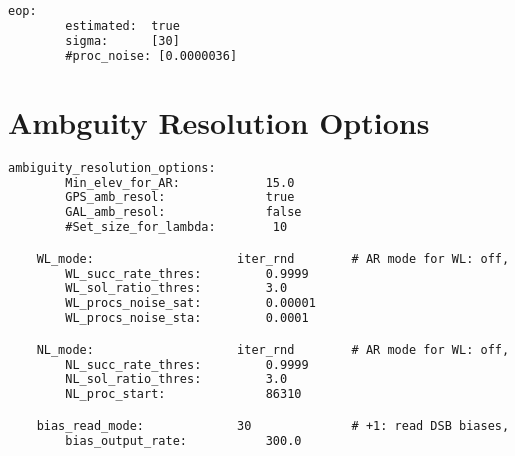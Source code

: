 \begin{lstlisting}[language=xml,caption=yaml input files configuration example]
	eop:
		estimated:  true
		sigma:      [30]
		#proc_noise: [0.0000036]

\end{lstlisting}


\section{Ambguity Resolution Options}
%
\begin{lstlisting}[language=xml,caption=yaml ambguity configuration example]
	ambiguity_resolution_options:
		Min_elev_for_AR:            15.0
		GPS_amb_resol:              true
		GAL_amb_resol:              false
		#Set_size_for_lambda:        10

	WL_mode:                    iter_rnd        # AR mode for WL: off, round, iter_rnd, bootst, lambda, lambda_alt, lambda_al2, lambda_bie
		WL_succ_rate_thres:         0.9999
		WL_sol_ratio_thres:         3.0
		WL_procs_noise_sat:         0.00001
		WL_procs_noise_sta:         0.0001

	NL_mode:                    iter_rnd        # AR mode for WL: off, round, iter_rnd, bootst, lambda, lambda_alt, lambda_al2, lambda_bie
		NL_succ_rate_thres:         0.9999
		NL_sol_ratio_thres:         3.0
		NL_proc_start:              86310

	bias_read_mode:             30              # +1: read DSB biases, +2: read OSB biases, +4: read code biases, +8: read phase biases, +16: read satellite bias, +32: read station bias,
		bias_output_rate:           300.0
\end{lstlisting}
